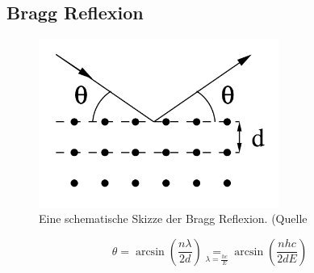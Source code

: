 \subsection{Bragg Reflexion}
\begin{figure}
    \centering
    \includegraphics[width=0.7\textwidth]{bilder/Bragg_Reflexion.png}
    \caption{Eine schematische Skizze der Bragg Reflexion. (Quelle \cite{Anleitung}}
    \label{fig:Bragg_Reflexion}
\end{figure}
\begin{equation}
    \theta = \arcsin\left( \frac{n\lambda}{2d}\right) \underset{\lambda = \frac{hc}{E}}{=} \arcsin\left( \frac{n h c}{2dE}\right) \label{eqn:Bragg_Bedingung}
\end{equation}
